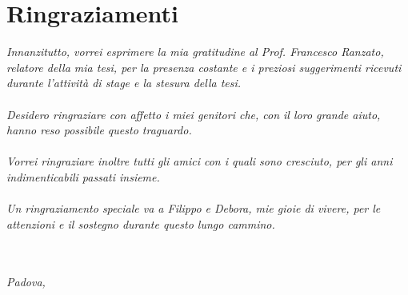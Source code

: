 \cleardoublepage
{}
{}




\bigskip

\begingroup
\let\clearpage\relax
\let\cleardoublepage\relax
\let\cleardoublepage\relax

\chapter{Ringraziamenti}
\textit{Innanzitutto, vorrei esprimere la mia gratitudine al Prof. Francesco Ranzato, relatore della mia tesi, per la presenza costante e i preziosi suggerimenti ricevuti durante l’attività di stage e la stesura della tesi.
	}
\\\\\textit{
	Desidero ringraziare con affetto i miei genitori che, con il loro grande aiuto, hanno
	reso possibile questo traguardo.
	}
\\\\\textit{
	Vorrei ringraziare inoltre tutti gli amici con i quali sono cresciuto, per gli anni indimenticabili
	passati insieme.
	}
\\\\\textit{
	Un ringraziamento speciale va a Filippo e Debora, mie gioie di vivere, per le attenzioni e il sostegno durante questo lungo cammino.
	}
\\ \\
\\
\begin{flushright}
	\myName
\end{flushright}
\begin{flushleft}
	\textit{Padova, \myTime} 
\end{flushleft}

